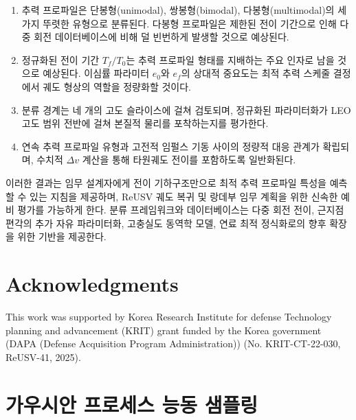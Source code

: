 \documentclass[a4paper,fleqn]{cas-dc}
\begin{document}
\begin{enumerate}
\item [TBD: database size, convergence rate, and class distribution statistics.] 추력 프로파일은 단봉형(unimodal), 쌍봉형(bimodal), 다봉형(multimodal)의 세 가지 뚜렷한 유형으로 분류된다. 다봉형 프로파일은 제한된 전이 기간으로 인해 다중 회전 데이터베이스에 비해 덜 빈번하게 발생할 것으로 예상된다.

\item [TBD: ARD length scale analysis with five parameters.] 정규화된 전이 기간 $T_f/T_0$는 추력 프로파일 형태를 지배하는 주요 인자로 남을 것으로 예상된다. 이심률 파라미터 $e_0$와 $e_f$의 상대적 중요도는 최적 추력 스케줄 결정에서 궤도 형상의 역할을 정량화할 것이다.

\item 분류 경계는 네 개의 고도 슬라이스에 걸쳐 검토되며, 정규화된 파라미터화가 LEO 고도 범위 전반에 걸쳐 본질적 물리를 포착하는지를 평가한다.

\item 연속 추력 프로파일 유형과 고전적 임펄스 기동 사이의 정량적 대응 관계가 확립되며, 수치적 $\Delta v$ 계산을 통해 타원궤도 전이를 포함하도록 일반화된다.
\end{enumerate}

이러한 결과는 임무 설계자에게 전이 기하구조만으로 최적 추력 프로파일 특성을 예측할 수 있는 지침을 제공하며, ReUSV 궤도 복귀 및 랑데부 임무 계획을 위한 신속한 예비 평가를 가능하게 한다. 분류 프레임워크와 데이터베이스는 다중 회전 전이, 근지점 편각의 추가 자유 파라미터화, 고충실도 동역학 모델, 연료 최적 정식화로의 향후 확장을 위한 기반을 제공한다.


\section*{Acknowledgments}
This work was supported by Korea Research Institute for defense Technology planning and advancement (KRIT) grant funded by the Korea government (DAPA (Defense Acquisition Program Administration)) (No. KRIT-CT-22-030, ReUSV-41, 2025).


\appendix
\section{가우시안 프로세스 능동 샘플링}\label{app:gp_sampling}
\end{document}
